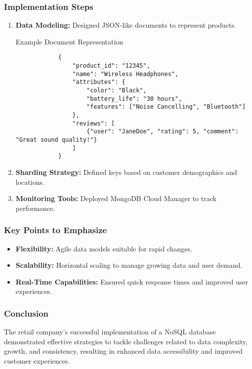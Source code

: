 \documentclass[aspectratio=169]{beamer}
\begin{document}
\begin{frame}[fragile]
    \frametitle{Implementation Steps}
    \begin{enumerate}
        \item \textbf{Data Modeling:} Designed JSON-like documents to represent products.
        \begin{block}{Example Document Representation}
            \begin{lstlisting}
            {
                "product_id": "12345",
                "name": "Wireless Headphones",
                "attributes": {
                    "color": "Black",
                    "battery_life": "30 hours",
                    "features": ["Noise Cancelling", "Bluetooth"]
                },
                "reviews": [
                    {"user": "JaneDoe", "rating": 5, "comment": "Great sound quality!"}
                ]
            }
            \end{lstlisting}
        \end{block}
        
        \item \textbf{Sharding Strategy:} Defined keys based on customer demographics and locations.
        
        \item \textbf{Monitoring Tools:} Deployed MongoDB Cloud Manager to track performance.
    \end{enumerate}
\end{frame}

\begin{frame}[fragile]
    \frametitle{Key Points to Emphasize}
    \begin{itemize}
        \item \textbf{Flexibility:} Agile data models suitable for rapid changes.
        \item \textbf{Scalability:} Horizontal scaling to manage growing data and user demand.
        \item \textbf{Real-Time Capabilities:} Ensured quick response times and improved user experiences.
    \end{itemize}
\end{frame}

\begin{frame}[fragile]
    \frametitle{Conclusion}
    The retail company’s successful implementation of a NoSQL database demonstrated effective strategies to tackle challenges related to data complexity, growth, and consistency, resulting in enhanced data accessibility and improved customer experiences.
\end{frame}
\end{document}
